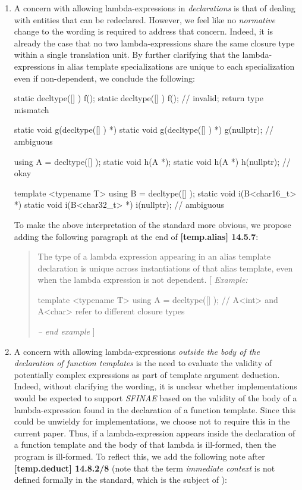 \documentclass[11pt]{article}
\begin{document}
\begin{enumerate}
  \item A concern with allowing lambda-expressions in \textit{declarations} is
  that of dealing with entities that can be redeclared. However, we feel like
  no \textit{normative} change to the wording is required to address that concern.
  Indeed, it is already the case that no two lambda-expressions share the same
  closure type within a single translation unit. By further clarifying that the
  lambda-expressions in alias template specializations are unique to each
  specialization even if non-dependent, we conclude the following:

\begin{cpp}
static decltype([] { }) f();
static decltype([] { }) f(); // invalid; return type mismatch

static void g(decltype([] { }) *) { }
static void g(decltype([] { }) *) { }
g(nullptr); // ambiguous

using A = decltype([] { });
static void h(A *);
static void h(A *) { }
h(nullptr); // okay

template <typename T>
using B = decltype([] { });
static void i(B<char16_t> *) { }
static void i(B<char32_t> *) { }
i(nullptr); // ambiguous
\end{cpp}

  To make the above interpretation of the standard more obvious, we propose
  adding the following paragraph at the end of \textbf{[temp.alias] 14.5.7}:
  \begin{quote}
    The type of a lambda expression appearing in an alias template declaration
    is unique across instantiations of that alias template, even when the
    lambda expression is not dependent.
    [ \textit{Example:}
\begin{cpp}
template <typename T>
using A = decltype([] {});
// A<int> and A<char> refer to different closure types
\end{cpp}
    \textit{-- end example} ]
  \end{quote}


  \item A concern with allowing lambda-expressions \textit{outside the body of
  the declaration of function templates} is the need to evaluate the validity
  of potentially complex expressions as part of template argument deduction.
  Indeed, without clarifying the wording, it is unclear whether implementations
  would be expected to support \textit{SFINAE} based on the validity of
  the body of a lambda-expression found in the declaration of a function
  template. Since this could be unwieldy for implementations, we choose not
  to require this in the current paper. Thus, if a lambda-expression appears
  inside the declaration of a function template and the body of that lambda
  is ill-formed, then the program is ill-formed. To reflect this, we add the
  following note after \textbf{[temp.deduct] 14.8.2/8} (note that the term
  \textit{immediate context} is not defined formally in the standard, which
  is the subject of \cite{CWG1844}):


\end{enumerate}
\end{document}
